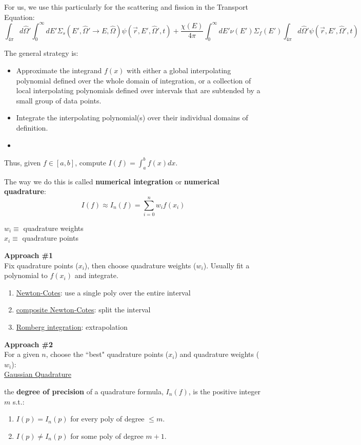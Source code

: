 \documentclass[12pt]{exam}
\newcommand{\vOmega}{\ensuremath{\hat{\Omega}}}
\begin{document}
For us, we use this particularly for the scattering and fission in the Transport Equation:
\[\int_{4\pi} d\vOmega' \int_0^{\infty} dE' \Sigma_s(E', \vOmega' \rightarrow E, \vOmega) \psi(\vec{r}, E', \vOmega', t)  +
 \frac{\chi(E)}{4\pi} \int_0^{\infty} dE' \nu(E') \Sigma_f(E') \int_{4\pi} d\vOmega' \psi(\vec{r}, E', \vOmega', t) \]

The general strategy is:
\begin{itemize}
\item Approximate the integrand $f(x)$ with either a global interpolating
polynomial defined over the whole domain of integration, or a
collection of local interpolating polynomials defined over intervals
that are subtended by a small group of data points.
\ifprintanswers
\item Integrate the interpolating polynomial(s) over their individual
domains of definition.
\else
\item
\fi
\end{itemize}

Thus, given $f \in[a,b]$, compute $I(f) = \int_a^b f(x) dx$.

The way we do this is called \textbf{numerical integration} or \textbf{numerical quadrature}:
\ifprintanswers
\[I(f) \approx I_n(f) = \sum_{i=0}^n w_i f(x_i)\]
\vspace*{-3em}

$w_i \equiv$ quadrature weights\\
$x_i \equiv$ quadrature points
\else
\vspace*{4em}
\fi

\textbf{Approach \#1}\\
Fix quadrature points ($x_i$), then choose quadrature weights ($w_i$). Usually fit a polynomial to $f(x_i)$ and integrate.
%
\begin{enumerate}%
\item \underline{Newton-Cotes}: use a single poly over the entire interval
\item \underline{composite Newton-Cotes}: split the interval
\item \underline{Romberg integration}: extrapolation
\end{enumerate}

\textbf{Approach \#2}\\
For a given $n$, choose the ``best" quadrature points ($x_i$) and quadrature weights ($w_i$):\\
\underline{Gaussian Quadrature}

\vspace*{1em}
the \textbf{degree of precision} of a quadrature formula, $I_n(f)$, is the positive integer $m$ s.t.:
\begin{enumerate}
\item $I(p) = I_n(p)$ for every poly of degree $\leq m$.
\item $I(p) \neq I_n(p)$ for some poly of degree $m+1$.
\end{enumerate}
 
\end{document}
